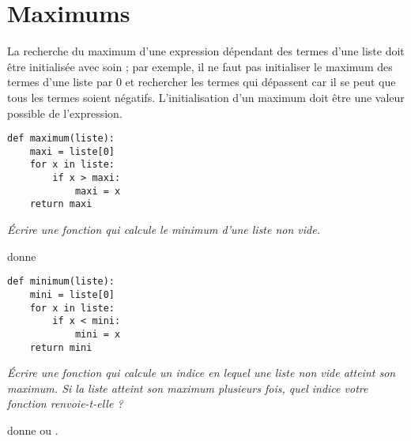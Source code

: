 \section{Maximums} 
La recherche du maximum d'une expression dépendant des termes d'une liste doit être initialisée avec soin ; par exemple, il ne faut pas initialiser le maximum des termes d'une liste par 0 et rechercher les termes qui dépassent car il se peut que tous les termes soient négatifs. L'initialisation d'un maximum doit être une valeur possible de l'expression.

\begin{lstlisting}
def maximum(liste):
    maxi = liste[0]
    for x in liste:
        if x > maxi:
            maxi = x
    return maxi
\end{lstlisting}
\begin{Exercise}[title =Minimum]
\it Écrire une fonction  qui calcule le minimum d'une liste non vide.

 donne 
\end{Exercise}
\begin{Answer}
\begin{lstlisting}
def minimum(liste):
    mini = liste[0]
    for x in liste:
        if x < mini:
            mini = x
    return mini
\end{lstlisting}
\end{Answer}
\begin{Exercise}[title=Indice du maximum]
\it Écrire une fonction  qui calcule un indice en lequel une liste non vide atteint son maximum. 
Si la liste atteint son maximum plusieurs fois, quel indice votre fonction renvoie-t-elle ?

 donne  ou .
\end{Exercise}
